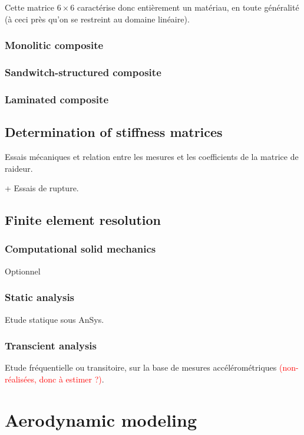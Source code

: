 \documentclass{article}
\begin{document}
Cette matrice $6\times 6$ caractérise donc entièrement un matériau, en toute généralité (à ceci près qu'on se restreint au domaine linéaire).

\subsubsection{Monolitic composite}

\subsubsection{Sandwitch-structured composite}

\subsubsection{Laminated composite}

\subsection{Determination of stiffness matrices}

Essais mécaniques et relation entre les mesures et les coefficients de la matrice de raideur.

+ Essais de rupture.

\subsection{Finite element resolution}

\subsubsection{Computational solid mechanics}

Optionnel

\subsubsection{Static analysis}

Etude statique sous AnSys.

\subsubsection{Transcient analysis}

Etude fréquentielle ou transitoire, sur la base de mesures accélérométriques \textcolor{red}{(non-réalisées, donc à estimer ?)}.

\section{Aerodynamic modeling}
\end{document}

